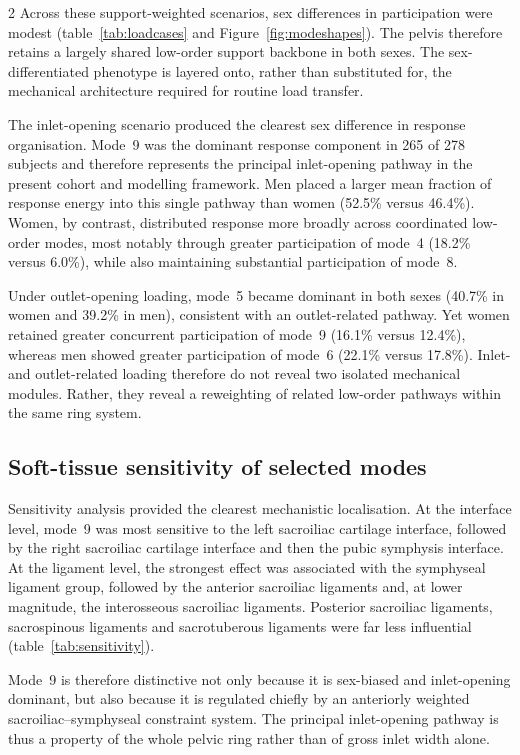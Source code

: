 \documentclass[openacc]{rsproca_new}
\begin{document}
\begin{multicols}{2}
Across these support-weighted scenarios, sex differences in participation were modest (table~\ref{tab:loadcases} and Figure~\ref{fig:modeshapes}). The pelvis therefore retains a largely shared low-order support backbone in both sexes. The sex-differentiated phenotype is layered onto, rather than substituted for, the mechanical architecture required for routine load transfer.

The inlet-opening scenario produced the clearest sex difference in response organisation. Mode~9 was the dominant response component in 265 of 278 subjects and therefore represents the principal inlet-opening pathway in the present cohort and modelling framework. Men placed a larger mean fraction of response energy into this single pathway than women (52.5\% versus 46.4\%). Women, by contrast, distributed response more broadly across coordinated low-order modes, most notably through greater participation of mode~4 (18.2\% versus 6.0\%), while also maintaining substantial participation of mode~8.

Under outlet-opening loading, mode~5 became dominant in both sexes (40.7\% in women and 39.2\% in men), consistent with an outlet-related pathway. Yet women retained greater concurrent participation of mode~9 (16.1\% versus 12.4\%), whereas men showed greater participation of mode~6 (22.1\% versus 17.8\%). Inlet- and outlet-related loading therefore do not reveal two isolated mechanical modules. Rather, they reveal a reweighting of related low-order pathways within the same ring system.

\subsection{Soft-tissue sensitivity of selected modes}

Sensitivity analysis provided the clearest mechanistic localisation. At the interface level, mode~9 was most sensitive to the left sacroiliac cartilage interface, followed by the right sacroiliac cartilage interface and then the pubic symphysis interface. At the ligament level, the strongest effect was associated with the symphyseal ligament group, followed by the anterior sacroiliac ligaments and, at lower magnitude, the interosseous sacroiliac ligaments. Posterior sacroiliac ligaments, sacrospinous ligaments and sacrotuberous ligaments were far less influential (table~\ref{tab:sensitivity}).

Mode~9 is therefore distinctive not only because it is sex-biased and inlet-opening dominant, but also because it is regulated chiefly by an anteriorly weighted sacroiliac--symphyseal constraint system. The principal inlet-opening pathway is thus a property of the whole pelvic ring rather than of gross inlet width alone.


\end{multicols}
\end{document}
